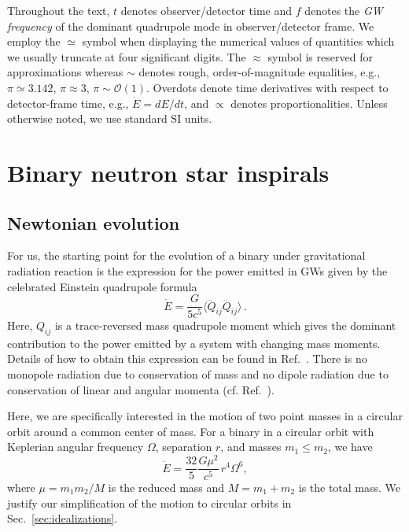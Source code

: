 \documentclass[prd,amsmath,amssymb,aps,floats,amsfonts,notitlepage,superscriptaddress,eqsecnum,nofootinbib,10pt]{revtex4-1}
\newcommand{\ord}{\mathcal{O}}
\newcommand{\f}{\frac}
\newcommand{\be}{\begin{equation}}
\newcommand{\ee}{\end{equation}}
\begin{document}
Throughout the text, $t$ denotes observer/detector time and $f$ denotes the \emph{GW frequency} of the dominant quadrupole mode in observer/detector frame. 
We employ the $\simeq$ symbol when displaying the numerical values of quantities %
which we usually truncate at four significant digits.
The $\approx$ symbol is reserved for approximations whereas $\sim$ denotes rough, order-of-magnitude equalities,
e.g., $\pi \simeq 3.142$, $\pi \approx 3$, $\pi \sim \ord(1)$. %
Overdots denote time derivatives with respect to detector-frame time, e.g., $\dot{E} =dE/dt$, and $\propto$ denotes proportionalities. 
Unless otherwise noted, we use standard SI units.

\section{Binary neutron star inspirals}\label{sec:BNS_inspiral}
\subsection{Newtonian evolution}
For us, the starting point for the evolution of a binary under gravitational radiation reaction
is the expression for the power emitted in GWs given by 
the celebrated Einstein quadrupole formula \cite{1918SPAW}
%
\be
\dot{E} = \f{G}{5c^5}\langle \dddot{Q}_{ij}\dddot{Q}_{ij} \rangle \label{eq:Edot_quadrupole}\, .
\ee
%
Here, $Q_{ij}$ is a trace-reversed mass quadrupole moment which
gives the dominant contribution to the power emitted %
by a system with changing mass moments. Details of how to obtain this expression can be found in Ref.~\cite{Maggiore}.
There is no monopole radiation due to conservation of mass and no dipole radiation due to conservation of linear and angular momenta
(cf. Ref.~\cite{Mono}).

Here, we are specifically interested in the motion of two point masses in a circular orbit around a common center of mass.
For a binary in a circular orbit with Keplerian angular frequency $\Omega$, separation $r$, and masses $m_1 \le m_2$, we have \cite{Maggiore}
%
\be
\dot{E} = \f{32}{5}\f{G\mu^2}{c^5}\, r^4 \Omega^6\label{eq:Edot},
\ee
%
where $\mu= m_1 m_2/M$ is the reduced mass and $M=m_1+m_2$ is the total mass. 
We justify our simplification of the motion to circular orbits in Sec.~\ref{sec:idealizations}.
\end{document}
